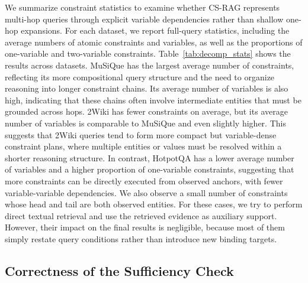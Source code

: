 \documentclass{article}
\theoremstyle{plain}
\theoremstyle{definition}
\theoremstyle{remark}
\begin{document}
We summarize constraint statistics to examine whether CS-RAG represents multi-hop queries through explicit variable dependencies rather than shallow one-hop expansions.
For each dataset, we report full-query statistics, including the average numbers of atomic constraints and variables, as well as the proportions of one-variable and two-variable constraints.
Table~\ref{tab:decomp_stats} shows the results across datasets.
MuSiQue has the largest average number of constraints, reflecting its more compositional query structure and the need to organize reasoning into longer constraint chains.
Its average number of variables is also high, indicating that these chains often involve intermediate entities that must be grounded across hops.
2Wiki has fewer constraints on average, but its average number of variables is comparable to MuSiQue and even slightly higher. This suggests that 2Wiki queries tend to form more compact but variable-dense constraint plans, where multiple entities or values must be resolved within a shorter reasoning structure.
In contrast, HotpotQA has a lower average number of variables and a higher proportion of one-variable constraints, suggesting that more constraints can be directly executed from observed anchors, with fewer variable-variable dependencies.
We also observe a small number of constraints whose head and tail are both observed entities.
For these cases, we try to perform direct textual retrieval and use the retrieved evidence as auxiliary support. However, their impact on the final results is negligible, because most of them simply restate query conditions rather than introduce new binding targets.
\begin{table}[h]
\centering
\caption{Constraint statistics across three datasets.}
\label{tab:decomp_stats}
\end{table}


\subsection{Correctness of the Sufficiency Check}
\label{app:sufficiency_correctness}
\end{document}
